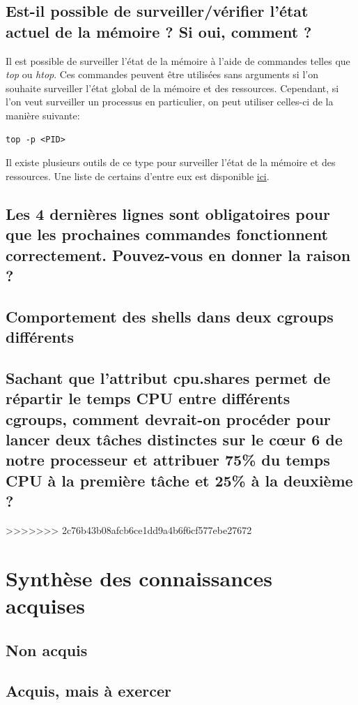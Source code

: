 \documentclass{ReportTemplate}
\begin{document}
\subsection{Est-il possible de surveiller/vérifier l’état actuel de la mémoire ? Si oui, comment ?}
Il est possible de surveiller l'état de la mémoire à l'aide de commandes telles
que \textit{top} ou \textit{htop}. Ces commandes peuvent être utilisées sans
arguments si l'on souhaite surveiller l'état global de la mémoire et des
ressources. Cependant, si l'on veut surveiller un processus en particulier, on
peut utiliser celles-ci de la manière suivante:
\begin{verbatim}
top -p <PID>
\end{verbatim}
Il existe plusieurs outils de ce type pour surveiller l'état de la mémoire et
des ressources. Une liste de certains d'entre eux est disponible \href{https://geekflare.com/fr/process-cpu-memory-monitoring/}{ici}.
\subsection{Les 4 dernières lignes sont obligatoires pour que les prochaines commandes fonctionnent correctement. Pouvez-vous en donner la raison ?}

\subsection{Comportement des shells dans deux cgroups différents}

\subsection{Sachant que l’attribut cpu.shares permet de répartir le temps CPU entre différents cgroups, comment devrait-on procéder pour lancer deux tâches distinctes sur le cœur 6 de notre processeur et attribuer 75\% du temps CPU à la première tâche et 25\% à la deuxième ?}
>>>>>>> 2c76b43b08afcb6ce1dd9a4b6f6cf577ebe27672

\section{Synthèse des connaissances acquises}
\subsection{Non acquis}

\subsection{Acquis, mais à exercer}
\end{document}
